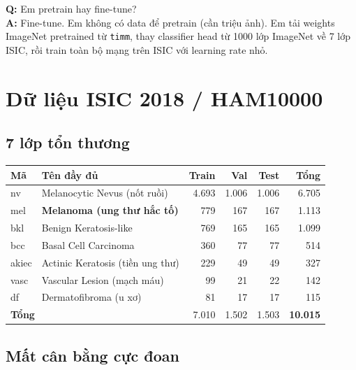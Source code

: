 \documentclass[11pt,a4paper]{article}
\begin{document}
\begin{qa}
\textbf{Q:} Em pretrain hay fine-tune?\\
\textbf{A:} Fine-tune. Em không có data để pretrain (cần triệu ảnh). Em tải weights ImageNet pretrained từ \texttt{timm}, thay classifier head từ 1000 lớp ImageNet về 7 lớp ISIC, rồi train toàn bộ mạng trên ISIC với learning rate nhỏ.
\end{qa}

\section{Dữ liệu ISIC 2018 / HAM10000}

\subsection{7 lớp tổn thương}

\begin{table}[h]
\centering\small
\begin{tabular}{llrrrr}
\toprule
\textbf{Mã} & \textbf{Tên đầy đủ} & \textbf{Train} & \textbf{Val} & \textbf{Test} & \textbf{Tổng} \\
\midrule
nv    & Melanocytic Nevus (nốt ruồi)           & 4.693 & 1.006 & 1.006 & 6.705 \\
mel   & \textbf{Melanoma (ung thư hắc tố)}     &   779 &   167 &   167 & 1.113 \\
bkl   & Benign Keratosis-like                  &   769 &   165 &   165 & 1.099 \\
bcc   & Basal Cell Carcinoma                   &   360 &    77 &    77 &   514 \\
akiec & Actinic Keratosis (tiền ung thư)       &   229 &    49 &    49 &   327 \\
vasc  & Vascular Lesion (mạch máu)             &    99 &    21 &    22 &   142 \\
df    & Dermatofibroma (u xơ)                  &    81 &    17 &    17 &   115 \\
\midrule
\multicolumn{2}{l}{\textbf{Tổng}} & 7.010 & 1.502 & 1.503 & \textbf{10.015}\\
\bottomrule
\end{tabular}
\end{table}

\subsection{Mất cân bằng cực đoan}
\end{document}
